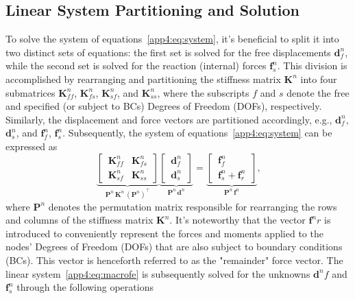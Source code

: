 \subsection{Linear System Partitioning and Solution}

To solve the system of equations~\eqref{app4:eq:system}, it's beneficial to split it into two distinct sets of equations: the first set is solved for the free displacements $\mathbf{d}^{n}_{f}$, while the second set is solved for the reaction (internal) forces $\mathbf{f}^{n}_{s}$. This division is accomplished by rearranging and partitioning the stiffness matrix $\mathbf{K}^{n}$ into four submatrices $\mathbf{K}^{n}_{ff}$, $\mathbf{K}^{n}_{fs}$, $\mathbf{K}^{n}_{sf}$, and $\mathbf{K}^{n}_{ss}$, where the subscripts $f$ and $s$ denote the free and specified (or subject to \acp{BC}) Degrees of Freedom (\acp{DOF}), respectively. Similarly, the displacement and force vectors are partitioned accordingly, e.g., $\mathbf{d}^{n}_{f}$, $\mathbf{d}^{n}_{s}$, and $\mathbf{f}^{n}_{f}$, $\mathbf{f}^{n}_{s}$. Subsequently, the system of equations~\eqref{app4:eq:system} can be expressed as
%
\begin{equation}
    \label{app4:eq:macrofe}
    \underbrace{\left[\,\begin{matrix}
      \mathbf{K}^{n}_{ff} & \mathbf{K}^{n}_{fs} \\[0.5em]
      \mathbf{K}^{n}_{sf} & \mathbf{K}^{n}_{ss}
    \end{matrix}\,\right]}_{\displaystyle \mathbf{P}^{n} \, \mathbf{K}^{n} \, (\mathbf{P}^{n})^\top} \underbrace{\left[\,\begin{matrix}
      \mathbf{d}^{n}_{f} \\[0.5em]
      \mathbf{d}^{n}_{s}
    \end{matrix}\,\right]}_{\displaystyle \mathbf{P}^{n} \, \mathbf{d}^{n}} = \underbrace{\left[\,\begin{matrix}
      \mathbf{f}^{n}_{f} \\[0.5em]
      \mathbf{f}^{n}_{s} + \mathbf{f}^{n}_{r}
    \end{matrix}\,\right]}_{\displaystyle \mathbf{P}^{n} \, \mathbf{f}^{n}} \text{,}
\end{equation}
%
where $\mathbf{P}^{n}$ denotes the permutation matrix responsible for rearranging the rows and columns of the stiffness matrix $\mathbf{K}^{n}$. It's noteworthy that the vector $\mathbf{f}^{n}{r}$ is introduced to conveniently represent the forces and moments applied to the nodes' Degrees of Freedom (\acp{DOF}) that are also subject to boundary conditions (\acp{BC}). This vector is henceforth referred to as the "remainder" force vector. The linear system~\eqref{app4:eq:macrofe} is subsequently solved for the unknowns $\mathbf{d}^{n}{f}$ and $\mathbf{f}^{n}_{s}$ through the following operations
